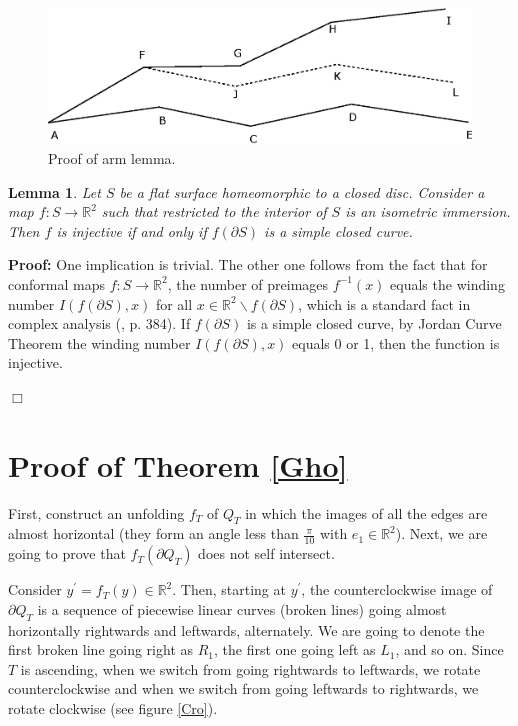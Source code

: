 \documentclass[openright, 12pt]{article}
\newtheorem{lema}[teorema]{Lemma}
\newcommand{\field}[1]{\ensuremath{\mathbb{#1}}}
\newcommand{\R}{\field{R}}
\begin{document}
\begin{figure}[h]
\centering
{}
\includegraphics[scale=0.95]{arms.eps}
\caption{Proof of arm lemma.}
\end{figure}



\begin{lema}\label{Argument}
{\rm Let $S$ be a flat surface homeomorphic to a closed disc. Consider a map $f: S \rightarrow \mathbb{R}^2$ such that restricted to the interior of $S$ is an isometric immersion. Then $f$ is injective if and only if $f(\partial S)$ is a simple closed curve. 
}
\end{lema}


\textbf{Proof: }One implication is trivial. The other one follows from the fact that for conformal maps $f: S \rightarrow \mathbb{R}^2$, the number of preimages $f^{-1}(x)$ equals the winding number $I(f(\partial S), x )$ for all $x \in \R^2  \backslash f(\partial S)$, which is a standard fact in complex analysis (\cite{Ma}, p. 384). If $f(\partial S)$ is a simple closed curve, by Jordan Curve Theorem \cite{Ha} the winding number $I(f(\partial S), x )$ equals 0 or 1, then the function is injective.


\hfill $\Box$

\section*{Proof of Theorem \ref{Gho}}

First, construct an unfolding $f_T$ of $Q_T$ in which the images of all the edges are almost horizontal (they form an angle less than $\frac{\pi}{10}$ with $e_1 \in \R ^2$). Next, we are going to prove that $f_T(\partial Q_T)$ does not self intersect.

Consider $y^{\prime} = f_T(y) \in \R ^2$. Then, starting at $y^{\prime}$, the counterclockwise image of $\partial Q_T$ is a sequence of piecewise linear curves (broken lines) going almost horizontally rightwards and leftwards, alternately. We are going to denote the first broken line going right as $R_1$, the first one going left as $L_1$, and so on. Since $T$ is ascending, when we switch from going rightwards to leftwards, we rotate counterclockwise and when we switch from going leftwards to rightwards, we rotate clockwise (see figure \ref{Cro}). 
\end{document}
